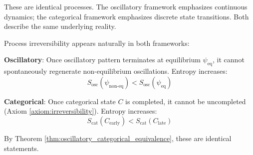 These are identical processes. The oscillatory framework emphasizes continuous dynamics; the categorical framework emphasizes discrete state transitions. Both describe the same underlying reality.

\begin{proposition}
\label{prop:entropy_increase_unified}
Process irreversibility appears naturally in both frameworks:

\textbf{Oscillatory}: Once oscillatory pattern terminates at equilibrium $\psi_{\text{eq}}$, it cannot spontaneously regenerate non-equilibrium oscillations. Entropy increases:
\begin{equation}
S_{\text{osc}}(\psi_{\text{non-eq}}) < S_{\text{osc}}(\psi_{\text{eq}})
\end{equation}

\textbf{Categorical}: Once categorical state $C$ is completed, it cannot be uncompleted (Axiom \ref{axiom:irreversibility}). Entropy increases:
\begin{equation}
S_{\text{cat}}(C_{\text{early}}) < S_{\text{cat}}(C_{\text{late}})
\end{equation}

By Theorem \ref{thm:oscillatory_categorical_equivalence}, these are identical statements.
\end{proposition}

